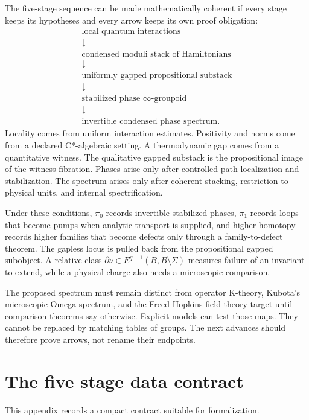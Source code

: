 \documentclass[12pt]{article}
\theoremstyle{definition}
\theoremstyle{remark}
\begin{document}
The five-stage sequence can be made mathematically coherent if every stage
keeps its hypotheses and every arrow keeps its own proof obligation:
\[
\boxed{
\begin{array}{c}
\text{local quantum interactions}\\
\downarrow\\
\text{condensed moduli stack of Hamiltonians}\\
\downarrow\\
\text{uniformly gapped propositional substack}\\
\downarrow\\
\text{stabilized phase }\infty\text{-groupoid}\\
\downarrow\\
\text{invertible condensed phase spectrum}.
\end{array}}
\]
Locality comes from uniform interaction estimates.  Positivity and norms
come from a declared C*-algebraic setting.  A thermodynamic gap comes from a
quantitative witness.  The qualitative gapped substack is the propositional
image of the witness fibration.  Phases arise only after controlled path
localization and stabilization.  The spectrum arises only after coherent
stacking, restriction to physical units, and internal spectrification.

Under these conditions, $\pi_0$ records invertible stabilized phases,
$\pi_1$ records loops that become pumps when analytic transport is supplied,
and higher homotopy records higher families that become defects only through
a family-to-defect theorem.  The gapless locus is pulled back from the
propositional gapped subobject.  A relative class
$\partial\nu\in E^{q+1}(B,B\setminus\Sigma)$ measures failure of an invariant
to extend, while a physical charge also needs a microscopic comparison.

The proposed spectrum must remain distinct from operator K-theory, Kubota's
microscopic Omega-spectrum, and the Freed-Hopkins field-theory target until
comparison theorems say otherwise.  Explicit models can test those maps.
They cannot be replaced by matching tables of groups.  The next advances
should therefore prove arrows, not rename their endpoints.

\appendix

\section{The five stage data contract}

This appendix records a compact contract suitable for formalization.
\end{document}
